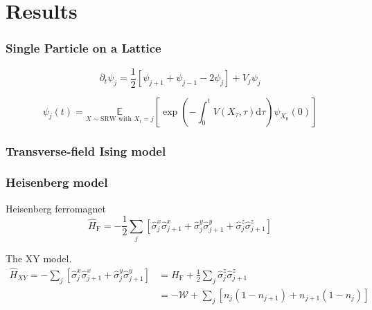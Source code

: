 
\chapter{Results}
\label{chapter6}

\ifpdf
\graphicspath{{Chapter5/Figs/Raster/}{Chapter5/Figs/PDF/}{Chapter5/Figs/}}
\else
\graphicspath{{Chapter5/Figs/Vector/}{Chapter5/Figs/}}
\fi

\subsection{Single Particle on a Lattice}
\begin{equation}
	\partial_{t} \psi_{j}=\frac{1}{2}\left[\psi_{j+1}+\psi_{j-1}-2 \psi_{j}\right]+V_{j} \psi_{j}
\end{equation}

\begin{equation}
	\psi_{j}(t)=\underset{X \sim \mathrm{SRW} \text { with } X_{t}=j}{\mathbb{E}} \left[\exp \left(-\int_{0}^{t}  V\left(X_{\tau}, \tau\right) \mathrm{d} \tau \right) \psi_{X_{0}}(0)\right]
\end{equation}

\subsection{Transverse-field Ising model}

\subsection{Heisenberg model}
Heisenberg ferromagnet
\begin{equation}
	\hat H_{\mathrm{F}}=-\frac{1}{2} \sum_{j}\left[\hat{\sigma}_{j}^{x} \hat{\sigma}_{j+1}^{x}+\hat{\sigma}_{j}^{y} \hat{\sigma}_{j+1}^{y}+\hat{\sigma}_{j}^{z} \hat{\sigma}_{j+1}^{z}\right]
\end{equation}

The XY model.
\begin{equation}
	\begin{aligned} 
		\hat H_{X Y}=-\sum_{j}\left[\hat{\sigma}_{j}^{x} \hat{\sigma}_{j+1}^{x}+\hat{\sigma}_{j}^{y} \hat{\sigma}_{j+1}^{y}\right] &=H_{\mathrm{F}}+\frac{1}{2} \sum_{j} \hat{\sigma}_{j}^{z} \hat{\sigma}_{j+1}^{z} \\ 						&=-\mathcal{W}+\sum_{j}\left[n_{j}\left(1-n_{j+1}\right)+n_{j+1}\left(1-n_{j}\right)\right] 
	\end{aligned}
\end{equation}

